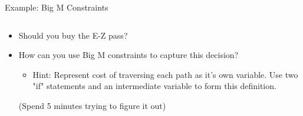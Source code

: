 \documentclass[10pt, aspectratio=169]{beamer}
\begin{document}
\begin{frame}{Example: Big M Constraints}
\begin{columns}
\begin{column}{0.5\textwidth}
\begin{figure}
            \end{figure}
            \begin{itemize}
                \item Should you buy the E-Z pass?
                \item How can you use Big M constraints to capture this decision?
                \begin{itemize}
                    \item Hint: Represent cost of traversing each path as it's own variable. Use two "if" statements and an intermediate variable to form this definition.
                \end{itemize}

                (Spend 5 minutes trying to figure it out)
            \end{itemize}
        \end{column}
    \end{columns}
\end{frame}
\end{document}
